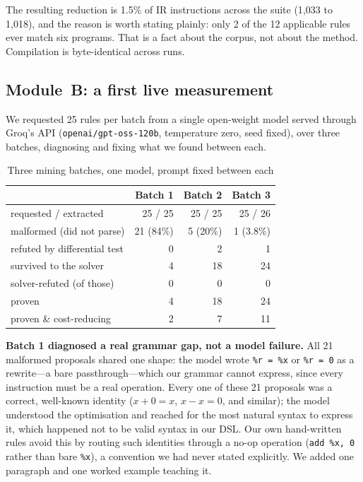 \documentclass[conference]{IEEEtran}
\begin{document}
The resulting reduction is 1.5\% of IR instructions across the suite (1{,}033 to
1{,}018), and the reason is worth stating plainly: only 2 of the 12 applicable
rules ever match six programs. That is a fact about the corpus, not about the
method. Compilation is byte-identical across runs.

\subsection{Module~B: a first live measurement}
\label{sec:moduleb-results}

We requested 25 rules per batch from a single open-weight model served
through Groq's API (\texttt{openai/gpt-oss-120b}, temperature zero, seed
fixed), over three batches, diagnosing and fixing what we found between each.

\begin{table}[t]
\caption{Three mining batches, one model, prompt fixed between each}
\label{tab:moduleb}
\centering
\footnotesize
\begin{tabular}{@{}lrrr@{}}
\toprule
 & \textbf{Batch 1} & \textbf{Batch 2} & \textbf{Batch 3} \\
\midrule
requested / extracted     & 25 / 25   & 25 / 25   & 25 / 26   \\
malformed (did not parse) & 21 (84\%) & 5 (20\%)  & 1 (3.8\%) \\
refuted by differential test & 0      & 2         & 1         \\
survived to the solver     & 4        & 18        & 24        \\
solver-refuted (of those)  & 0        & 0         & 0         \\
proven                     & 4        & 18        & 24        \\
proven \& cost-reducing    & 2        & 7         & 11        \\
\bottomrule
\end{tabular}
\end{table}

\textbf{Batch 1 diagnosed a real grammar gap, not a model failure.} All 21
malformed proposals shared one shape: the model wrote \texttt{\%r = \%x} or
\texttt{\%r = 0} as a rewrite---a bare passthrough---which our grammar cannot
express, since every instruction must be a real operation. Every one of these
21 proposals was a correct, well-known identity ($x+0=x$, $x-x=0$, and
similar); the model understood the optimisation and reached for the most
natural syntax to express it, which happened not to be valid syntax in our
DSL. Our own hand-written rules avoid this by routing such identities through
a no-op operation (\texttt{add \%x, 0} rather than bare \texttt{\%x}), a
convention we had never stated explicitly. We added one paragraph and one
worked example teaching it.
\end{document}
